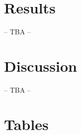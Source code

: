 \documentclass[11pt]{article}
\begin{document}
\section*{Results}

-- TBA --

\section*{Discussion}
-- TBA --


\renewcommand*{\refname}{Literature Cited}


%


\clearpage{}
\section*{Tables}
\end{document}
